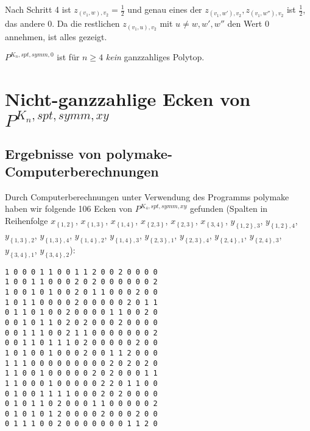 \documentclass[10p,a4paper,BCOR = 12mm, DIV=15]{scrbook}
\begin{document}
{\begin{bew}
Nach Schritt 4 ist $z_{\left(v_1, w\right), v_2} = \frac{1}{2}$ und genau eines der $z_{\left(v_1, w'\right), v_2}, z_{\left(v_1, w''\right), v_2}$ ist $\frac{1}{2}$, das andere $0$. Da die restlichen $z_{\left(v_1, u\right), v_2}$ mit $u \neq w, w', w''$ den Wert $0$ annehmen, ist alles gezeigt.
\end{bew}

\begin{Kor}
$P^{K_n, spt, symm, 0}$ ist für $n\geq 4$ \emph{kein} ganzzahliges Polytop.
\end{Kor}

\section{Nicht-ganzzahlige Ecken von $P^{K_n, spt, symm, xy}$}

\subsection{Ergebnisse von polymake-Computerberechnungen}

\label{sec:ergebnis_computerberechnungen}

Durch Computerberechnungen unter Verwendung des Programms polymake \cite{polymake} haben wir folgende 106 Ecken von $P^{K_4, spt, symm, xy}$ gefunden (Spalten in Reihenfolge $x_{\left\{1, 2\right\}}$, $x_{\left\{1, 3\right\}}$, $x_{\left\{1, 4\right\}}$, $x_{\left\{2, 3\right\}}$, $x_{\left\{2, 3\right\}}$, $x_{\left\{3, 4\right\}}$, $y_{\left\{1, 2\right\}, 3}$, $y_{\left\{1, 2\right\}, 4}$, $y_{\left\{1, 3\right\}, 2}$, $y_{\left\{1, 3\right\}, 4}$, $y_{\left\{1, 4\right\}, 2}$, $y_{\left\{1, 4\right\}, 3}$, $y_{\left\{2, 3\right\}, 1}$, $y_{\left\{2, 3\right\}, 4}$, $y_{\left\{2, 4\right\}, 1}$, $y_{\left\{2, 4\right\}, 3}$, $y_{\left\{3, 4\right\}, 1}$, $y_{\left\{3, 4\right\}, 2}$):
\begin{verbatim}
1 0 0 0 1 1 0 0 1 1 2 0 0 2 0 0 0 0
1 0 0 1 1 0 0 0 2 0 2 0 0 0 0 0 0 2
1 0 0 1 0 1 0 0 2 0 1 1 0 0 0 2 0 0
1 0 1 1 0 0 0 0 2 0 0 0 0 0 2 0 1 1
0 1 1 0 1 0 0 2 0 0 0 0 1 1 0 0 2 0
0 0 1 0 1 1 0 2 0 2 0 0 0 2 0 0 0 0
0 0 1 1 1 0 0 2 1 1 0 0 0 0 0 0 0 2
0 0 1 1 0 1 1 1 0 2 0 0 0 0 0 2 0 0
1 0 1 0 0 1 0 0 0 2 0 0 1 1 2 0 0 0
1 1 1 0 0 0 0 0 0 0 0 0 2 0 2 0 2 0
1 1 0 0 1 0 0 0 0 0 2 0 2 0 0 0 1 1
1 1 0 0 0 1 0 0 0 0 0 2 2 0 1 1 0 0
0 1 0 0 1 1 1 1 0 0 0 2 0 2 0 0 0 0
0 1 0 1 1 0 2 0 0 0 1 1 0 0 0 0 0 2
0 1 0 1 0 1 2 0 0 0 0 2 0 0 0 2 0 0
0 1 1 1 0 0 2 0 0 0 0 0 0 0 1 1 2 0


\end{verbatim}}
\end{document}
